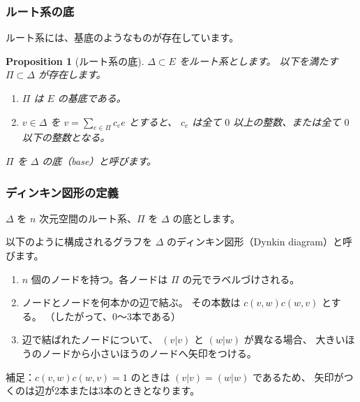 \documentclass{beamer}
\newtheorem{proposition}{Proposition}
\begin{document}
\begin{frame}
    \frametitle{ルート系の底}

    ルート系には、基底のようなものが存在しています。

    \begin{proposition}[ルート系の底]
        $\Delta \subset E$ をルート系とします。
        以下を満たす $\Pi \subset \Delta$ が存在します。

        \begin{enumerate}
            \item $\Pi$ は $E$ の基底である。
            \item $v \in \Delta$ を $v = \sum_{e \in \Pi} c_e e$ とすると、
                  $c_e$ は全て $0$ 以上の整数、または全て $0$ 以下の整数となる。
        \end{enumerate}

        $\Pi$ を $\Delta$ の底（base）と呼びます。
    \end{proposition}
\end{frame}

\begin{frame}
    \frametitle{ディンキン図形の定義}

    \begin{definition}[ディンキン図形]
        $\Delta$ を $n$ 次元空間のルート系、$\Pi$ を $\Delta$ の底とします。

        以下のように構成されるグラフを $\Delta$ のディンキン図形（Dynkin diagram）と呼びます。

        \begin{enumerate}
            \item $n$ 個のノードを持つ。各ノードは $\Pi$ の元でラベルづけされる。
            \item ノードとノードを何本かの辺で結ぶ。
                  その本数は $c(v,w) c(w,v)$ とする。
                  （したがって、0〜3本である）
            \item 辺で結ばれたノードについて、
                  $(v|v)$ と $(w|w)$ が異なる場合、
                  大きいほうのノードから小さいほうのノードへ矢印をつける。
        \end{enumerate}

        補足：$c(v,w) c(w,v) = 1$ のときは $(v|v) = (w|w)$ であるため、
        矢印がつくのは辺が2本または3本のときとなります。
    \end{definition}
\end{frame}
\end{document}
